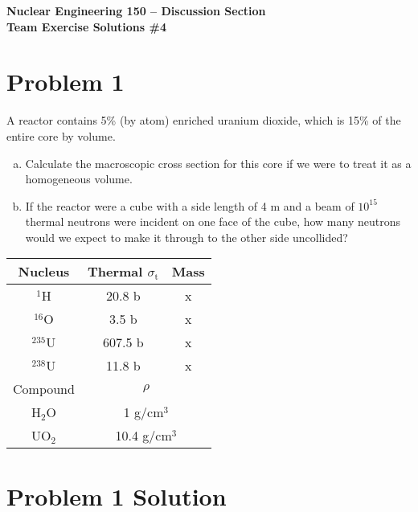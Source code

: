 \documentclass{report}
\begin{document}
\begin{center}
\textbf{\large Nuclear Engineering 150 -- Discussion Section}\\ 
\textbf{Team Exercise Solutions \#4}
\end{center}

\section*{Problem 1}

A reactor contains 5\% (by atom) enriched uranium dioxide, which is 15\% of the entire core by volume.
\begin{enumerate}[a)]
\item Calculate the macroscopic cross section for this core if we were to treat it as a homogeneous volume. 
\item If the reactor were a cube with a side length of 4 m and a beam of $10^{15}$ thermal neutrons were incident on one face of the cube, how many neutrons would we expect to make it through to the other side uncollided?
\end{enumerate}

\begin{table}[htbp]
	\centering
	\begin{tabular}{|c|c|c|}
			\hline
			Nucleus		& Thermal $\sigma_{\text{t}}$ & Mass \\
			\hline
			$^{1}$H		&  20.8 b 						& x		\\
			$^{16}$O	&  3.5 b  						& x		\\
			$^{235}$U	&  607.5 b  					& x		\\
			$^{238}$U	&  11.8 b  						& x		\\
			\hline
			Compound	& \multicolumn{2}{|c|}{$\rho$}          \\
			\hline
			H$_2$O		& \multicolumn{2}{|c|}{1 g/cm$^3$}      \\
			UO$_2$		& \multicolumn{2}{|c|}{10.4 g/cm$^3$}	\\
			\hline
	\end{tabular}
	\label{tab:design-specs}
\end{table}



\section*{Problem 1 Solution}
\end{document}
